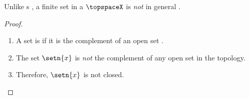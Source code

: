 \begin{counterex}
\label{cnt:ts_closed_finite}
Unlike s , 
a finite set in a   $\topspaceX$ 
is \emph{not} in general  .
\end{counterex}
\begin{proof}
\begin{enumerate}
  \item A set is  if it is the complement of an open set .
  \item The set $\setn{x}$ is \emph{not} the complement of any open set in the topology.
  \item Therefore, $\setn{x}$ is not closed.
\end{enumerate}
\end{proof}

